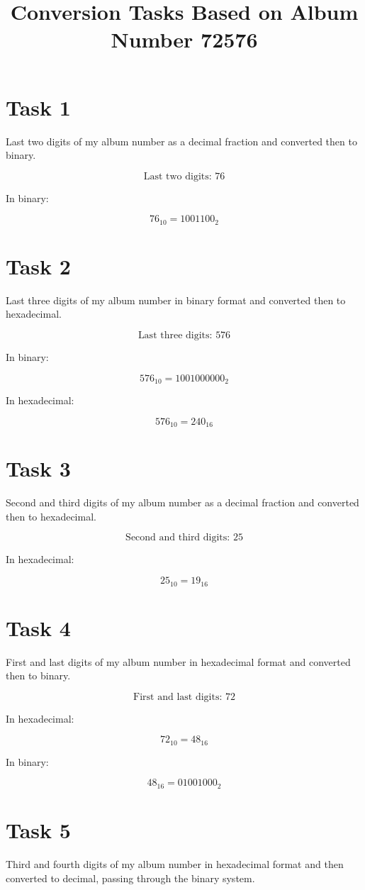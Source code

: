 \documentclass{article}
\begin{document}
\title{Conversion Tasks Based on Album Number 72576}
\author{}
\date{}
\maketitle

\section*{Task 1}
Last two digits of my album number as a decimal fraction and converted then to binary.

\[
\text{Last two digits: } 76
\]

In binary:

\[
76_{10} = 1001100_2
\]

\section*{Task 2}
Last three digits of my album number in binary format and converted then to hexadecimal.

\[
\text{Last three digits: } 576
\]

In binary:

\[
576_{10} = 1001000000_2
\]

In hexadecimal:

\[
576_{10} = 240_{16}
\]

\section*{Task 3}
Second and third digits of my album number as a decimal fraction and converted then to hexadecimal.

\[
\text{Second and third digits: } 25
\]

In hexadecimal:

\[
25_{10} = 19_{16}
\]

\section*{Task 4}
First and last digits of my album number in hexadecimal format and converted then to binary.

\[
\text{First and last digits: } 72
\]

In hexadecimal:

\[
72_{10} = 48_{16}
\]

In binary:

\[
48_{16} = 01001000_2
\]

\section*{Task 5}
Third and fourth digits of my album number in hexadecimal format and then converted to decimal, passing through the binary system.
\end{document}
